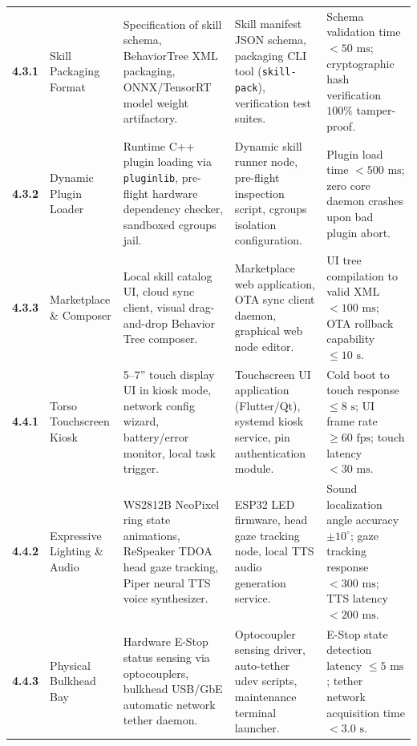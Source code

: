 \documentclass[10pt,a4paper]{article}
\begin{document}
\begin{small}
\begin{longtable}{@{}p{} p{} p{} p{} p{}@{}}
\textbf{4.3.1} & 
Skill Packaging Format & 
Specification of skill schema, BehaviorTree XML packaging, ONNX/TensorRT model weight artifactory. & 
Skill manifest JSON schema, packaging CLI tool (\texttt{skill-pack}), verification test suites. & 
Schema validation time $<50\text{ ms}$; cryptographic hash verification $100\%$ tamper-proof. \\
\addlinespace[3pt]

\textbf{4.3.2} & 
Dynamic Plugin Loader & 
Runtime C++ plugin loading via \texttt{pluginlib}, pre-flight hardware dependency checker, sandboxed cgroups jail. & 
Dynamic skill runner node, pre-flight inspection script, cgroups isolation configuration. & 
Plugin load time $<500\text{ ms}$; zero core daemon crashes upon bad plugin abort. \\
\addlinespace[3pt]

\textbf{4.3.3} & 
Marketplace \& Composer & 
Local skill catalog UI, cloud sync client, visual drag-and-drop Behavior Tree composer. & 
Marketplace web application, OTA sync client daemon, graphical web node editor. & 
UI tree compilation to valid XML $<100\text{ ms}$; OTA rollback capability $\le 10\text{ s}$. \\
\midrule

\textbf{4.4.1} & 
Torso Touchscreen Kiosk & 
5--7'' touch display UI in kiosk mode, network config wizard, battery/error monitor, local task trigger. & 
Touchscreen UI application (Flutter/Qt), systemd kiosk service, pin authentication module. & 
Cold boot to touch response $\le 8\text{ s}$; UI frame rate $\ge 60\text{ fps}$; touch latency $<30\text{ ms}$. \\
\addlinespace[3pt]

\textbf{4.4.2} & 
Expressive Lighting \& Audio & 
WS2812B NeoPixel ring state animations, ReSpeaker TDOA head gaze tracking, Piper neural TTS voice synthesizer. & 
ESP32 LED firmware, head gaze tracking node, local TTS audio generation service. & 
Sound localization angle accuracy $\pm 10^\circ$; gaze tracking response $<300\text{ ms}$; TTS latency $<200\text{ ms}$. \\
\addlinespace[3pt]

\textbf{4.4.3} & 
Physical Bulkhead Bay & 
Hardware E-Stop status sensing via optocouplers, bulkhead USB/GbE automatic network tether daemon. & 
Optocoupler sensing driver, auto-tether udev scripts, maintenance terminal launcher. & 
E-Stop state detection latency $\le 5\text{ ms}$; tether network acquisition time $<3.0\text{ s}$. \\
\midrule


\end{longtable}
\end{small}
\end{document}
